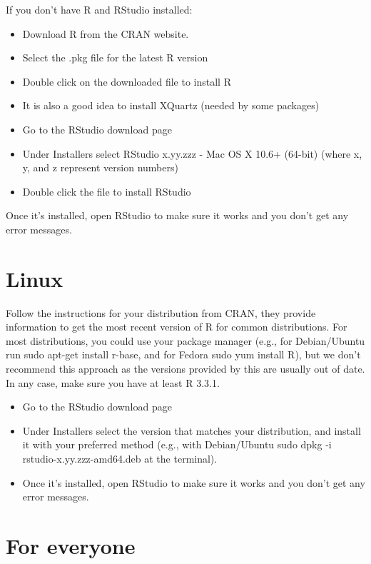 \documentclass[]{book}
\providecommand{\tightlist}{%
  \setlength{\itemsep}{0pt}\setlength{\parskip}{0pt}}
\begin{document}
If you don't have R and RStudio installed:

\begin{itemize}
\tightlist
\item
  Download R from the CRAN website.
\item
  Select the .pkg file for the latest R version
\item
  Double click on the downloaded file to install R
\item
  It is also a good idea to install XQuartz (needed by some packages)
\item
  Go to the RStudio download page
\item
  Under Installers select RStudio x.yy.zzz - Mac OS X 10.6+ (64-bit)
  (where x, y, and z represent version numbers)
\item
  Double click the file to install RStudio
\end{itemize}

Once it's installed, open RStudio to make sure it works and you don't
get any error messages.

\section{Linux}\label{linux}

Follow the instructions for your distribution from CRAN, they provide
information to get the most recent version of R for common
distributions. For most distributions, you could use your package
manager (e.g., for Debian/Ubuntu run sudo apt-get install r-base, and
for Fedora sudo yum install R), but we don't recommend this approach as
the versions provided by this are usually out of date. In any case, make
sure you have at least R 3.3.1.

\begin{itemize}
\tightlist
\item
  Go to the RStudio download page
\item
  Under Installers select the version that matches your distribution,
  and install it with your preferred method (e.g., with Debian/Ubuntu
  sudo dpkg -i rstudio-x.yy.zzz-amd64.deb at the terminal).
\item
  Once it's installed, open RStudio to make sure it works and you don't
  get any error messages.
\end{itemize}

\section{For everyone}\label{for-everyone}
\end{document}
